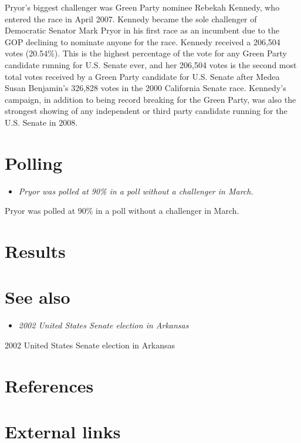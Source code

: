 Pryor's biggest challenger was Green Party nominee Rebekah Kennedy, who
entered the race in April 2007. Kennedy became the sole challenger of
Democratic Senator Mark Pryor in his first race as an incumbent due to
the GOP declining to nominate anyone for the race. Kennedy received a
206,504 votes (20.54\%). This is the highest percentage of the vote for
any Green Party candidate running for U.S. Senate ever, and her 206,504
votes is the second most total votes received by a Green Party candidate
for U.S. Senate after Medea Susan Benjamin's 326,828 votes in the 2000
California Senate race. Kennedy's campaign, in addition to being record
breaking for the Green Party, was also the strongest showing of any
independent or third party candidate running for the U.S. Senate in
2008.

\section{Polling}\label{polling}

\begin{itemize}
\item
  \emph{Pryor was polled at 90\% in a poll without a challenger in
  March.}
\end{itemize}

Pryor was polled at 90\% in a poll without a challenger in March.

\section{Results}\label{results}

\section{See also}\label{see-also}

\begin{itemize}
\item
  \emph{2002 United States Senate election in Arkansas}
\end{itemize}

2002 United States Senate election in Arkansas

\section{References}\label{references}

\section{External links}\label{external-links}

